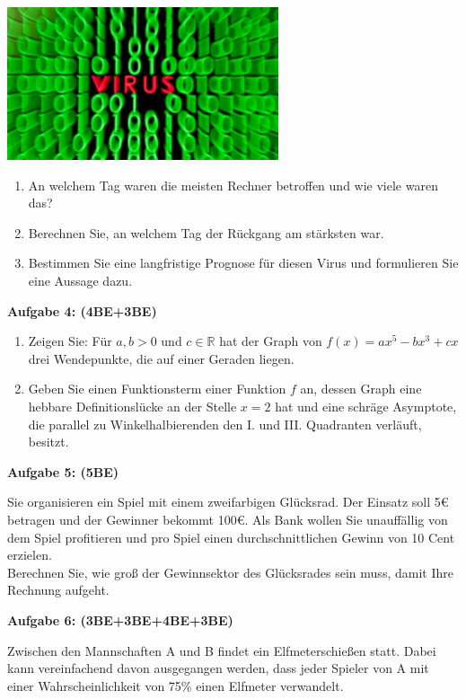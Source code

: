 \documentclass[a4paper,12pt]{article}
\newcommand{\Aufgabe}[1]{
  {
  \vspace*{0.5cm}
  \textsf{\textbf{Aufgabe #1}}
  \vspace*{0.2cm}
  
  }
}
\begin{document}
\begin{center}
  {\includegraphics[height=4.5cm]{Q12_1Klausur_Ana_Sto_v2_NachholTermin_02.jpeg}}
\end{center}

\begin{enumerate}[label={\alph*)}] 
  \item An welchem Tag waren die meisten Rechner betroffen und wie viele waren das?
  \item Berechnen Sie, an welchem Tag der Rückgang am stärksten war.
  \item Bestimmen Sie eine langfristige Prognose für diesen Virus und formulieren Sie eine Aussage dazu.
\end{enumerate}


\Aufgabe{4: (4BE+3BE)} 
\begin{enumerate}[label={\alph*)}] 
  \item Zeigen Sie: Für $a,b > 0$ und $c \in {\mathbb{R}}$  hat der Graph von $f(x)=ax^5-bx^3+cx$ drei Wendepunkte, die auf einer Geraden liegen.
\item Geben Sie einen Funktionsterm einer Funktion $f$ an, dessen Graph eine hebbare Definitionslücke an der Stelle $x=2$ hat und eine schräge Asymptote, die parallel zu Winkelhalbierenden den I. und III. Quadranten verläuft, besitzt.
\end{enumerate}


\Aufgabe{5: (5BE)} 
Sie organisieren ein Spiel mit einem zweifarbigen Glücksrad. Der Einsatz soll 5€ betragen und der Gewinner bekommt 100€. Als Bank wollen Sie unauffällig von dem Spiel profitieren und pro Spiel einen durchschnittlichen Gewinn von 10 Cent erzielen.\\
Berechnen Sie, wie groß der Gewinnsektor des Glücksrades sein muss, damit Ihre Rechnung aufgeht.

\newpage
\Aufgabe{6: (3BE+3BE+4BE+3BE)} 
Zwischen den Mannschaften A und B findet ein Elfmeterschießen statt. Dabei kann vereinfachend davon ausgegangen werden, dass jeder Spieler von A mit einer Wahrscheinlichkeit von 75\% einen Elfmeter verwandelt.\\
\end{document}
